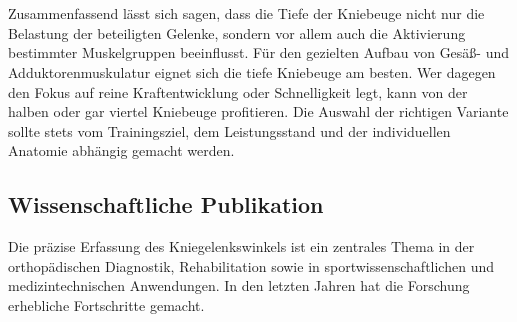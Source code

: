 \\
\\
Zusammenfassend lässt sich sagen, dass die Tiefe der Kniebeuge nicht nur die Belastung der beteiligten Gelenke, sondern vor allem auch die Aktivierung bestimmter Muskelgruppen beeinflusst. Für den gezielten Aufbau von Gesäß- und Adduktorenmuskulatur eignet sich die tiefe Kniebeuge am besten. Wer dagegen den Fokus auf reine Kraftentwicklung oder Schnelligkeit legt, kann von der halben oder gar viertel Kniebeuge profitieren. Die Auswahl der richtigen Variante sollte stets vom Trainingsziel, dem Leistungsstand und der individuellen Anatomie abhängig gemacht werden. \cite{Meinart}

\subsection{Wissenschaftliche Publikation}
\noindent Die präzise Erfassung des Kniegelenkswinkels ist ein zentrales Thema in der orthopädischen Diagnostik, Rehabilitation sowie in sportwissenschaftlichen und medizintechnischen Anwendungen. In den letzten Jahren hat die Forschung erhebliche Fortschritte gemacht. 

